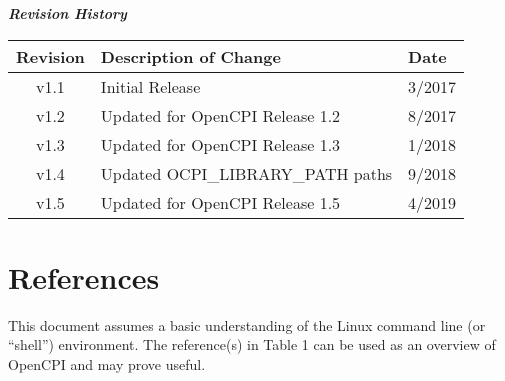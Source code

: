 	\begin{center}
	\textit{\textbf{Revision History}}
		\begin{table}[H]
		\label{table:revisions} %
			\begin{tabularx}{\textwidth}{|c|X|l|}
			\hline
			\rowcolor{blue}
			\textbf{Revision} & \textbf{Description of Change} & \textbf{Date} \\
		    \hline
		    v1.1 & Initial Release & 3/2017 \\
		    \hline
		    v1.2 & Updated for OpenCPI Release 1.2 & 8/2017 \\
			\hline
			v1.3 & Updated for OpenCPI Release 1.3 & 1/2018 \\
			\hline
			v1.4 & Updated OCPI\_LIBRARY\_PATH paths & 9/2018 \\
			\hline
			v1.5 & Updated for OpenCPI Release 1.5 & 4/2019 \\
			\hline
			\end{tabularx}
		\end{table}
	\end{center}

\newpage

\tableofcontents

\newpage

\section{References}

	This document assumes a basic understanding of the Linux command line (or ``shell'') environment.  The reference(s) in Table 1 can be used as an overview of OpenCPI and may prove useful.

\def\myreferences{
\hline
FSK App\footnote{Provides details of the ``FSK App'' reference application} & \path{FSK_app.pdf} \\
}


